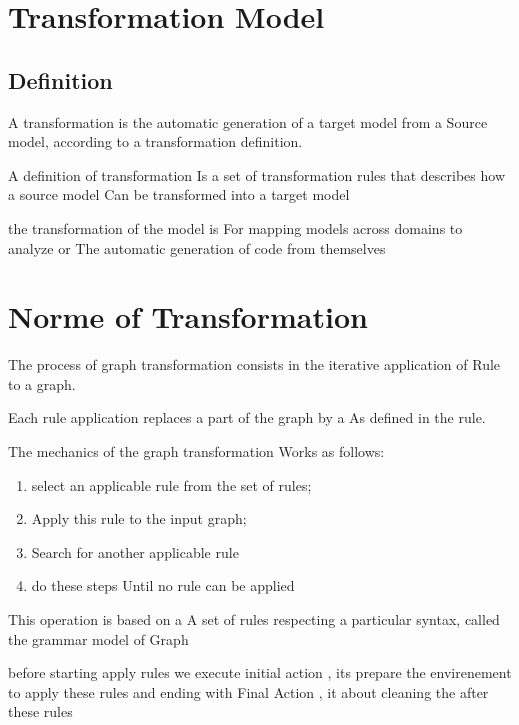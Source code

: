 \section{Transformation Model}


\subsection{Definition}
A transformation is the automatic generation of a target model from a
Source model, according to a transformation definition. 

A definition of transformation Is a set of transformation rules 
that describes how a source model
Can be transformed into a target model

 the transformation of the model is
For mapping models across domains to analyze or
The automatic generation of code from themselves

\section{Norme of Transformation } 
 The process of graph transformation consists in the iterative application of
Rule to a graph.

 Each rule application replaces a part of the graph by a
As defined in the rule. 

The mechanics of the graph transformation
Works as follows: 
\begin{enumerate}
\item select an applicable rule from the set of rules;
\item Apply this rule to the input graph;

\item Search for another applicable rule  
\item do these steps Until  no rule can be applied

\end{enumerate}

 
This operation is based on a
A set of rules respecting a particular syntax, called the grammar model of
Graph

before starting apply rules we execute initial action , 
its prepare the envirenement to apply these rules
and ending with Final Action , it about cleaning the after these rules

